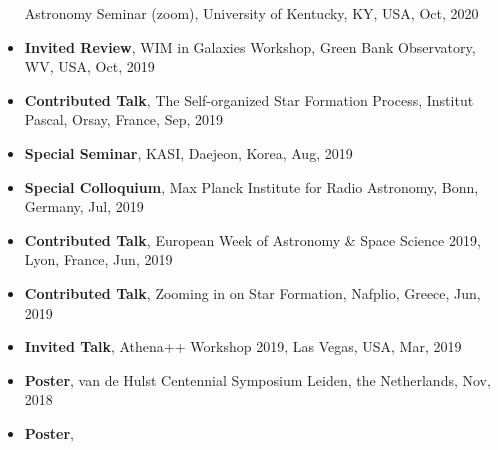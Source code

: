\documentclass[11pt,letterpaper,roman]{moderncv}        %
\begin{document}
\begin{itemize}
  Astronomy Seminar (zoom), University of Kentucky, KY, USA, Oct, 2020 %
\item \textbf{Invited Review},
  WIM in Galaxies Workshop, Green Bank Observatory, WV, USA, Oct, 2019 %
\item \textbf{Contributed Talk},
  The Self-organized Star Formation Process, Institut Pascal, Orsay, France, Sep, 2019 %
\item \textbf{Special Seminar},
  KASI, Daejeon, Korea, Aug, 2019 %
\item \textbf{Special Colloquium},
  Max Planck Institute for Radio Astronomy, Bonn, Germany, Jul, 2019 %
\item \textbf{Contributed Talk},
  European Week of Astronomy \& Space Science 2019, Lyon, France, Jun, 2019 %
\item \textbf{Contributed Talk},
  Zooming in on Star Formation, Nafplio, Greece, Jun, 2019 %
\item \textbf{Invited Talk},
  Athena++ Workshop 2019, Las Vegas, USA, Mar, 2019 %
\item \textbf{Poster},
  van de Hulst Centennial Symposium %
  Leiden, the Netherlands, Nov, 2018 %
\item \textbf{Poster},

\end{itemize}
\end{document}
